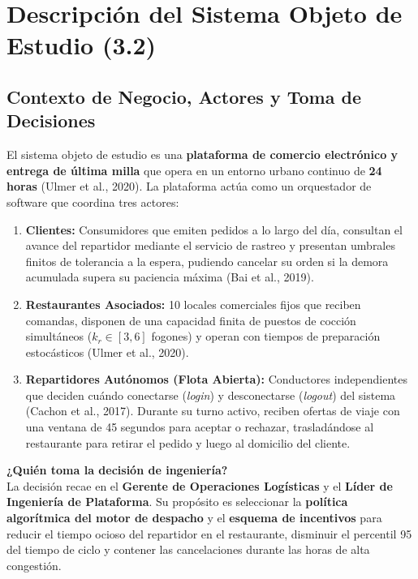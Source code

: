 \documentclass[11pt,letterpaper]{article}
\begin{document}
\section{Descripción del Sistema Objeto de Estudio (3.2)}

\subsection{Contexto de Negocio, Actores y Toma de Decisiones}
El sistema objeto de estudio es una \textbf{plataforma de comercio electrónico y entrega de última milla} que opera en un entorno urbano continuo de \textbf{24 horas} (Ulmer et al., 2020). La plataforma actúa como un orquestador de software que coordina tres actores:
\begin{enumerate}[leftmargin=1.5em, itemsep=0.2em]
    \item \textbf{Clientes:} Consumidores que emiten pedidos a lo largo del día, consultan el avance del repartidor mediante el servicio de rastreo y presentan umbrales finitos de tolerancia a la espera, pudiendo cancelar su orden si la demora acumulada supera su paciencia máxima (Bai et al., 2019).
    \item \textbf{Restaurantes Asociados:} 10 locales comerciales fijos que reciben comandas, disponen de una capacidad finita de puestos de cocción simultáneos ($k_r \in [3, 6]$ fogones) y operan con tiempos de preparación estocásticos (Ulmer et al., 2020).
    \item \textbf{Repartidores Autónomos (Flota Abierta):} Conductores independientes que deciden cuándo conectarse (\textit{login}) y desconectarse (\textit{logout}) del sistema (Cachon et al., 2017). Durante su turno activo, reciben ofertas de viaje con una ventana de 45 segundos para aceptar o rechazar, trasladándose al restaurante para retirar el pedido y luego al domicilio del cliente.
\end{enumerate}

\noindent \textbf{¿Quién toma la decisión de ingeniería?} \\
La decisión recae en el \textbf{Gerente de Operaciones Logísticas} y el \textbf{Líder de Ingeniería de Plataforma}. Su propósito es seleccionar la \textbf{política algorítmica del motor de despacho} y el \textbf{esquema de incentivos} para reducir el tiempo ocioso del repartidor en el restaurante, disminuir el percentil 95 del tiempo de ciclo y contener las cancelaciones durante las horas de alta congestión.
\end{document}
